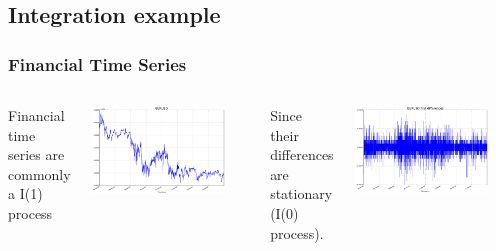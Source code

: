 \documentclass[xcolor=dvipsnames]{beamer}
\begin{document}
\subsection{Integration example}
\begin{frame}
\frametitle{Financial Time Series}
\begin{columns}
\column[t]{5cm}
Financial time series are commonly a I(1) process 
\begin{center}
\includegraphics[width=0.85\textwidth]{img/EURUSD}
\end{center}
\column[t]{5cm}
Since their differences are stationary (I(0) process).
\begin{center}
\includegraphics[width=0.85\textwidth]{img/DEURUSD}
\end{center}
\end{columns}
\end{frame}
\end{document}
